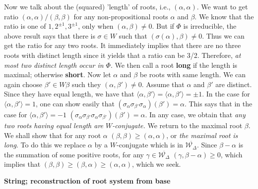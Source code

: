\documentclass{article}
\begin{document}
Now we talk about the (squared) 'length' of roots, i.e., $(\alpha, \alpha)$.
We want to get ratio $(\alpha, \alpha) / (\beta, \beta)$ for any non-propositional roots $\alpha$ and $\beta$.
We know that the ratio is one of $1, 2^{\pm 1}, 3^{\pm 1}$, only when $(\alpha, \beta) \ne 0$.
But if $\Phi$ is irreducible, the above result says that there is $\sigma \in W$ such that $(\sigma(\alpha), \beta) \ne 0$.
Thus we can get the ratio for any two roots.
It immediately implies that there are no three roots with distinct length since it yields that a ratio can be 3/2.
Therefore, \textit{at most two distinct length occur in $\Phi$}.
We then call a root \textbf{long} if the length is maximal; otherwise \textbf{short}.
Now let $\alpha$ and $\beta$ be roots with same length.
We can again choose $\beta' \in W\beta$ such they $(\alpha, \beta') \ne 0$.
Assume that $\alpha$ and $\beta'$ are distinct.
Since they have equal length, we have that $\langle \alpha, \beta' \rangle = \langle \alpha, \beta' \rangle = \pm 1$.
In the case for $\langle \alpha, \beta' \rangle = 1$, one can show easily that $(\sigma_\alpha \sigma_{\beta'} \sigma_\alpha)(\beta') = \alpha$.
This says that in the case for $\langle \alpha, \beta' \rangle = -1$ $(\sigma_\alpha \sigma_{\beta'} \sigma_\alpha \sigma_{\beta'})(\beta') = \alpha$.
In any case, we obtain that \textit{any two roots having equal length are $W$-conjugate.}
We return to the maximal root $\beta$.
We shall show that for any root $\alpha$ $(\beta, \beta) \ge (\alpha, \alpha)$, or \textit{the maximal root is long}.
To do this we replace $\alpha$ by a $W$-conjugate which is in $\overline{\mathcal{W}_\Delta}$.
Since $\beta - \alpha$ is the summation of some positive roots, for any $\gamma \in \overline{\mathcal{W}_\Delta}$ $(\gamma, \beta - \alpha) \ge 0$, which implies that $(\beta, \beta) \ge (\beta, \alpha) \ge (\alpha, \alpha)$, which we seek.

\newpage

\textbf{String; reconstruction of root system from base}
\end{document}
